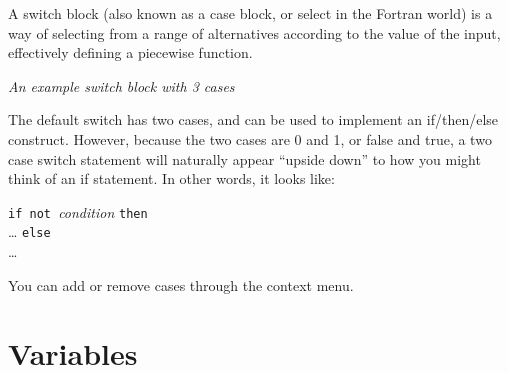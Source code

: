 A switch block (also known as a case block, or select in the Fortran
world) is a way of selecting from a range of alternatives according
to the value of the input, effectively defining a piecewise function.

\begin{center}
{\em An example switch block with 3 cases}
\end{center}

The default switch has two cases, and can be used to implement an
if/then/else construct. However, because the two cases are 0 and 1,
or false and true, a two case switch statement will naturally appear
``upside down'' to how you might think of an if statement. In other
words, it looks like:

\parbox{\textwidth}{
{\tt if not }{\em condition} {\tt then}\\
 \ldots
{\tt else}\\
\ldots
}

You can add or remove cases through the context menu. 

\section{Variables}\label{Variable:constant}\label{Variable:parameter}
\label{Variable:flow}\label{Variable:integral}\label{Variable:stock}

